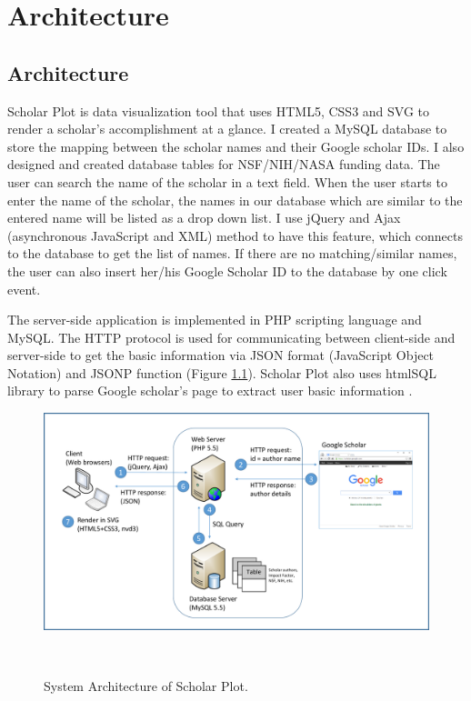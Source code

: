 \chapter{Architecture}\label{chap:Algorithms}
\section{Architecture}
Scholar Plot is data visualization tool that uses HTML5, CSS3 and SVG to render a scholar's accomplishment at a glance. I created a MySQL database to store the mapping between the scholar names and their Google scholar IDs. I also designed and created database tables for NSF/NIH/NASA funding data. The user can search the name of the scholar in a text field. When the user starts to enter the name of the scholar, the names in our database which are similar to the entered name will be listed as a drop down list. I use jQuery and Ajax (asynchronous JavaScript and XML) method to have this feature, which connects to the database to get the list of names. If there are no matching/similar names, the user can also insert her/his Google Scholar ID to the database by one click event.

The server-side application is implemented in PHP scripting language and MySQL. The HTTP protocol is used for communicating between client-side and server-side to get the basic information via JSON format (JavaScript Object Notation) and JSONP function (Figure \ref{fig:fig-arch}). Scholar Plot also uses htmlSQL library to parse Google scholar's page to extract user basic information \cite{htmlSQL}.

\begin{figure}
\centering
  \includegraphics[width=1\columnwidth]{figures/fig_system_architecture.pdf}
  \caption{System Architecture of Scholar Plot.}~\label{fig:fig-arch}
\end{figure}

